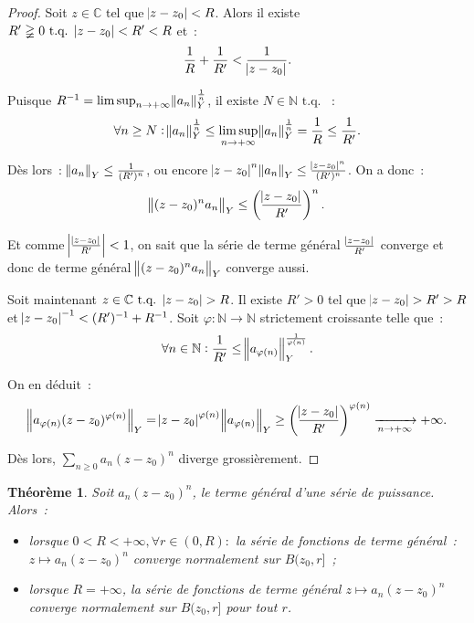\documentclass{report}
\newtheorem{thm}{Théorème}[chapter]
\theoremstyle{definition}
\theoremstyle{remark}
\numberwithin{equation}{section}
\newcommand{\C}{\mathbb C}
\newcommand{\N}{\mathbb N}
\newcommand{\tq}{\text{ t.q. }}
\newcommand{\pinfty}{{+\infty}}
\begin{document}
			\begin{proof} Soit $z \in \C$ tel que $\abs {z - z_0} < R$. Alors il existe $R' \gneqq 0 \tq \abs {z - z_0} < R' < R$ et~:
			\begin{equation}
				\frac 1R + \frac 1{R'} < \frac 1{\abs {z - z_0}}.
			\end{equation}

			Puisque $R^{-1} = \limsup_{n \to \pinfty}\norm{a_n}_Y^{\frac 1n}$, il existe $N \in \N \tq$~:
			\begin{equation}
				\forall n \geq N : \norm {a_n}_Y^{\frac 1n} \leq \limsup_{n \to \pinfty} \norm {a_n}_Y^{\frac 1n} = \frac 1R \leq \frac 1{R'}.
			\end{equation}

			Dès lors~: $\norm {a_n}_Y \leq \frac 1{(R')^n}$, ou encore $\abs {z - z_0}^n\norm {a_n}_Y \leq \frac {\abs {z - z_0}^n}{(R')^n}$. On a donc~:
			\begin{equation}
				\norm {(z-z_0)^na_n}_Y \leq \left(\frac {\abs {z - z_0}}{R'}\right)^n.
			\end{equation}

			Et comme $\abs {\frac {\abs {z - z_0}}{R'}} < 1$, on sait que la série de terme général $\frac {\abs {z - z_0}}{R'}$ converge et donc de terme
			général $\norm {(z - z_0)^na_n}_Y$ converge aussi.

			Soit maintenant $z \in \C \tq \abs {z - z_0} > R$. Il existe $R' > 0$ tel que $\abs {z - z_0} > R' > R$ et $\abs {z - z_0}^{-1} < (R')^{-1} + R^{-1}$.
			Soit $\varphi: \N \to \N$ strictement croissante telle que~:
			\begin{equation}
				\forall n \in \N : \frac 1{R'} \leq \norm {a_{\varphi(n)}}_Y^{\frac 1{\varphi(n)}}.
			\end{equation}

			On en déduit~:
			\begin{equation}
				\norm {a_{\varphi(n)}(z - z_0)^{\varphi(n)}}_Y = \abs {z - z_0}^{\varphi(n)}\norm {a_{\varphi(n)}}_Y
				\geq \left(\frac {\abs {z - z_0}}{R'}\right)^{\varphi(n)} \xrightarrow[n \to \pinfty]{} \pinfty.
			\end{equation}

			Dès lors, $\sum_{n \geq 0}a_n(z - z_0)^n$ diverge grossièrement.
			\end{proof}

			\begin{thm}\label{thm:cvnsurrayondeconvergence} Soit $a_n(z - z_0)^n$, le terme général d'une série de puissance. Alors~:
			\begin{itemize}
				\item lorsque $0 < R < \pinfty, \forall r \in (0, R) :$ la série de fonctions de terme général~: $z \mapsto a_n(z - z_0)^n$ converge normalement
				sur $B(z_0, r]$~;
				\item lorsque $R = \pinfty$, la série de fonctions de terme général $z \mapsto a_n(z - z_0)^n$ converge normalement sur $B(z_0, r]$ pour tout $r$.
			\end{itemize}
			\end{thm}
\end{document}
